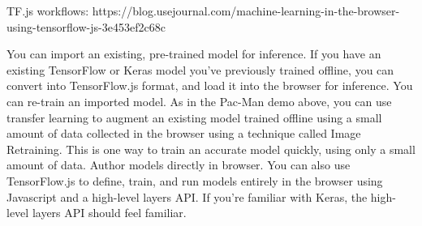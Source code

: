 TF.js workflows: https://blog.usejournal.com/machine-learning-in-the-browser-using-tensorflow-js-3e453ef2c68c

You can import an existing, pre-trained model for inference. If you have an existing TensorFlow or Keras model you’ve previously trained offline, you can convert into TensorFlow.js format, and load it into the browser for inference.
You can re-train an imported model. As in the Pac-Man demo above, you can use transfer learning to augment an existing model trained offline using a small amount of data collected in the browser using a technique called Image Retraining. This is one way to train an accurate model quickly, using only a small amount of data.
Author models directly in browser. You can also use TensorFlow.js to define, train, and run models entirely in the browser using Javascript and a high-level layers API. If you’re familiar with Keras, the high-level layers API should feel familiar.